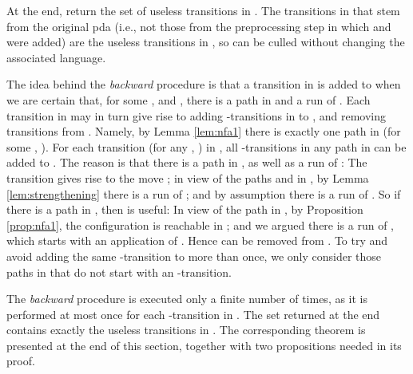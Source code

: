 \documentclass{llncs}
\begin{document}
\vspace{1mm}

\noindent
At the end, return the set  of useless transitions in . The transitions in  that stem from the original pda 
(i.e., not those from the preprocessing step in which  and  were added) are the useless transitions in , so can be culled without
changing the associated language.

The idea behind the {\em backward} procedure is that a transition  in  is added to  when
we are certain that, for some ,  and , there is a path
 in 
and a run  of .
Each transition  in  may in turn give rise to adding -transitions in  to ,
and removing transitions from . Namely, by Lemma \ref{lem:nfa1} there is exactly one path  in  (for some , ).
For each transition  (for any , ) in ,
all -transitions in any path  in 
can be added to . The reason is that there is a path  in ,
as well as a run  of : The transition  gives rise to the move ;
in view of the paths  and  in ,
by Lemma \ref{lem:strengthening} there is a run  of ; and
by assumption there is a run  of . So if there is a path  in ,
then  is useful: In view of the path  in , by Proposition \ref{prop:nfa1},
the configuration  is reachable in ; and we argued there is a run  of ,
which starts with an application of . Hence  can be removed from .
To try and avoid adding the same -transition to  more than once,
we only consider those paths  in  that do not start with an -transition.

The {\em backward} procedure is executed only a finite number of times, as it is performed at most once for each -transition in .
The set  returned at the end contains exactly the useless transitions in .
The corresponding theorem is presented at the end of this section, together with two propositions needed in its proof.
\end{document}
